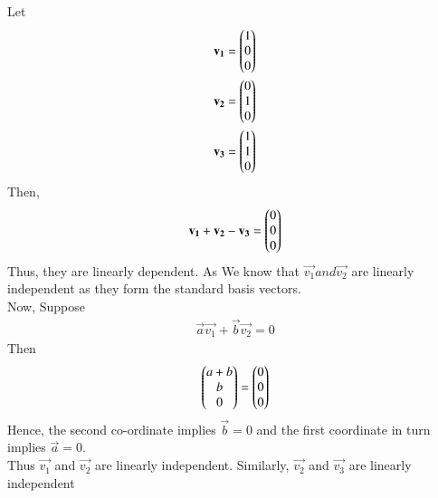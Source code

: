 Let 
\begin{align}
\mathbf{v_1} = \begin{pmatrix}1\\0\\0\end{pmatrix}\\
\mathbf{v_2} = \begin{pmatrix}0\\1\\0\end{pmatrix}\\
\mathbf{v_3} = \begin{pmatrix}1\\1\\0\end{pmatrix}
\end{align}
Then,
    \begin{align}
    \mathbf{v_1}+\mathbf{v_2}-\mathbf{v_3}=\begin{pmatrix}0\\0\\0\end{pmatrix}
    \end{align}
Thus, they are linearly dependent. As We know that $\vec{v_1} and \vec{v_2}$ are linearly independent as they form the standard basis vectors.\\
Now, Suppose 
\begin{align}
\vec{a}\vec{v_1}+\vec{b}\vec{v_2}=0
\end{align}
Then
\begin{align}
 \begin{pmatrix}a+b\\b\\0\end{pmatrix}=\begin{pmatrix}0\\0\\0\end{pmatrix}   
\end{align}
    Hence, the second co-ordinate implies $\vec{b}=0$ and the first coordinate in turn implies $\vec{a}=0$.\\
    Thus $\vec{v_1}$ and $\vec{v_2}$ are linearly independent. Similarly, $\vec{v_2}$ and $\vec{v_3}$ are linearly independent

